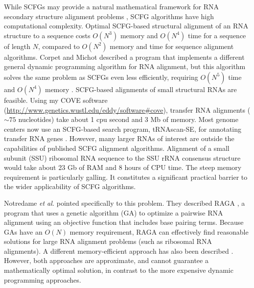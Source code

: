 \documentclass[11pt]{article}
\begin{document}
While SCFGs may provide a natural mathematical framework for RNA
secondary structure alignment problems \cite{Durbin98}, SCFG
algorithms have high computational complexity. Optimal SCFG-based
structural alignment of an RNA structure to a sequence costs $O(N^3)$
memory and $O(N^4)$ time for a sequence of length $N$, compared to
$O(N^2)$ memory and time for sequence alignment algorithms. Corpet and
Michot described a program that implements a different general dynamic
programming algorithm for RNA alignment, but this algorithm solves the
same problem as SCFGs even less efficiently, requiring $O(N^5)$ time
and $O(N^4)$ memory \cite{Corpet94}.  SCFG-based alignments of small
structural RNAs are feasible. Using my COVE software
(\url{http://www.genetics.wustl.edu/eddy/software#cove}), transfer RNA
alignments ($\sim 75$ nucleotides) take about 1 cpu second and 3 Mb of
memory. Most genome centers now use an SCFG-based search program,
tRNAscan-SE, for annotating transfer RNA genes
\cite{LoweEddy97}. However, many larger RNAs of interest are outside
the capabilities of published SCFG alignment algorithms. Alignment of
a small subunit (SSU) ribosomal RNA sequence to the SSU rRNA consensus
structure would take about 23 Gb of RAM and 8 hours of CPU time. The
steep memory requirement is particularly galling. It constitutes a
significant practical barrier to the wider applicability of SCFG
algorithms.


Notredame \emph{et al.} pointed specifically to this problem.  They
described RAGA \cite{Notredame97}, a program that uses a genetic
algorithm (GA) to optimize a pairwise RNA alignment using an objective
function that includes base pairing terms. Because GAs have an $O(N)$
memory requirement, RAGA can effectively find reasonable solutions for
large RNA alignment problems (such as ribosomal RNA alignments). A
different memory-efficient approach has also been described
\cite{Lenhof98,LenhofVingron98}. However, both approaches are
approximate, and cannot guarantee a mathematically optimal solution,
in contrast to the more expensive dynamic programming approaches.
\end{document}
